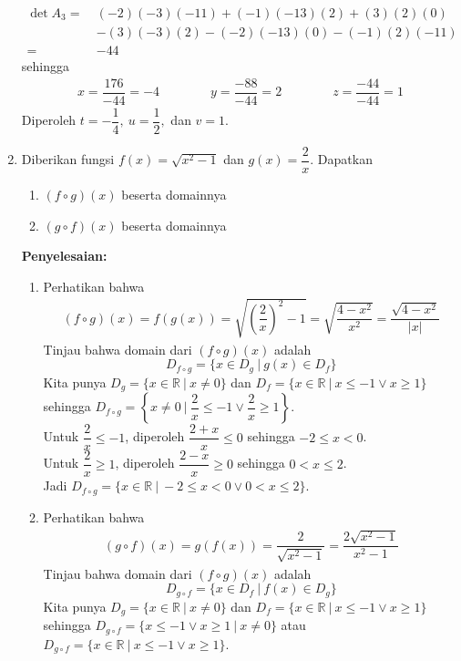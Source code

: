 \documentclass{article}
\begin{document}
\begin{enumerate}
\begin{align*}
    \det A_3 = ~&(-2)(-3)(-11)+(-1)(-13)(2)+(3)(2)(0)\\
    &-(3)(-3)(2)-(-2)(-13)(0)-(-1)(2)(-11) \\
    = ~&-44
    \end{align*}
    sehingga 
    \begin{align*}
    x = \dfrac{176}{-44} = -4 \qquad \qquad y = \dfrac{-88}{-44} = 2 \qquad \qquad z = \dfrac{-44}{-44} = 1
    \end{align*}
    Diperoleh $t=-\dfrac{1}{4},~ u=\dfrac{1}{2},$ dan $v=1$.
    \item Diberikan fungsi $f(x)=\sqrt{x^2-1}$ dan $g(x)=\dfrac{2}{x}$. Dapatkan 
    \begin{enumerate}
        \item $(f\circ g)(x)$ beserta domainnya
        \item $(g\circ f)(x)$ beserta domainnya
    \end{enumerate}
    \textbf{Penyelesaian:}
    \begin{enumerate}
        \item Perhatikan bahwa 
        \begin{align*}
        (f\circ g)(x) = f(g(x)) = \sqrt{\left(\dfrac{2}{x}\right)^2-1} = \sqrt{\dfrac{4-x^2}{x^2}} = \dfrac{\sqrt{4-x^2}}{|x|}
        \end{align*}
        Tinjau bahwa domain dari $(f\circ g) (x)$ adalah 
        $$ D_{f\circ g} = \{x\in D_g ~| ~g(x) \in D_f\}$$
        Kita punya $D_g = \{x\in \mathbb{R} ~|~ x\neq 0\} $ dan $D_f = \{x\in \mathbb{R}~ | ~x\leq -1 \vee x\geq 1\}$ sehingga $D_{f\circ g} = \left\{x\neq 0 ~\bigg|~ \dfrac{2}{x}\leq -1 \vee \dfrac{2}{x}\geq 1\right\}$. \\
        Untuk $\dfrac{2}{x}\leq-1$, diperoleh $\dfrac{2+x}{x}\leq 0$ sehingga $-2\leq x<0$.\\
        Untuk $\dfrac{2}{x}\geq 1$, diperoleh $\dfrac{2-x}{x}\geq 0$ sehingga $0<x\leq 2$.\\
        Jadi $D_{f\circ g} = \{x\in \mathbb{R} ~|~ -2\leq x<0 \vee 0<x\leq 2\}$.
        \item Perhatikan bahwa 
        \begin{align*}
        (g\circ f)(x) = g(f(x)) = \dfrac{2}{\sqrt{x^2-1}} = \dfrac{2\sqrt{x^2-1}}{x^2-1}
        \end{align*}
        Tinjau bahwa domain dari $(f\circ g) (x)$ adalah 
        $$ D_{g\circ f} = \{x\in D_f ~| ~f(x) \in D_g\}$$
        Kita punya $D_g = \{x\in \mathbb{R} ~|~ x\neq 0\} $ dan $D_f = \{x\in \mathbb{R}~ | ~x\leq -1 \vee x\geq 1\}$ sehingga $D_{g\circ f} = \{x\leq -1 \vee x\geq 1 ~|~ x\neq 0\}$ atau $D_{g\circ f} = \{x\in \mathbb{R} ~|~ x\leq -1 \vee x\geq 1\}$.

\end{enumerate}
\end{enumerate}
\end{document}

